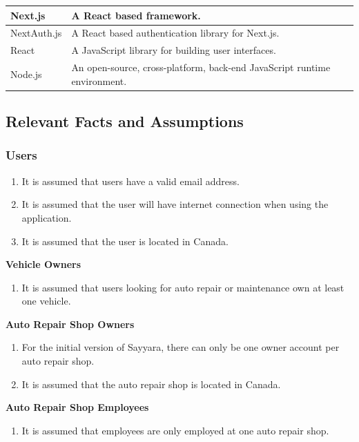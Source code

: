 \documentclass[12pt]{article}
\begin{document}
\begin{table}[H]
\begin{tabular}{ |p{5cm}|p{10.5cm}|  }
		\hline
		Next.js                               & A React based framework.                                                 \\
		\hline
		NextAuth.js                           & A React based authentication library for Next.js.                        \\
		\hline
		React                                 & A JavaScript library for building user interfaces.                       \\
		\hline
		Node.js                               & An open-source, cross-platform, back-end JavaScript runtime environment. \\
		\hline
	\end{tabular}
\end{table}

\subsection{Relevant Facts and Assumptions}
\subsubsection{Users}
\begin{enumerate}
	\item It is assumed that users have a valid email address.
	\item It is assumed that the user will have internet connection when using the application.
	\item It is assumed that the user is located in Canada.
\end{enumerate}

\textbf{Vehicle Owners}
\begin{enumerate}
	\item It is assumed that users looking for auto repair or maintenance own at least one vehicle.
\end{enumerate}

\textbf{Auto Repair Shop Owners}
\begin{enumerate}
	\item For the initial version of Sayyara, there can only be one owner account per auto repair shop.
	\item It is assumed that the auto repair shop is located in Canada.
\end{enumerate}

\textbf{Auto Repair Shop Employees}
\begin{enumerate}
	\item It is assumed that employees are only employed at one auto repair shop.
\end{enumerate}
\end{document}
